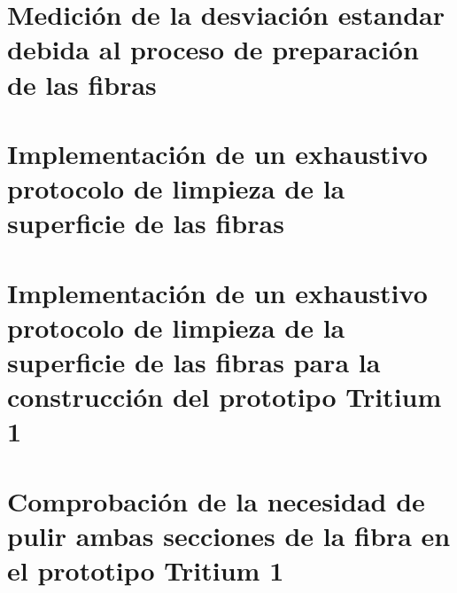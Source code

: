 \documentclass[11pt,a4paper]{article}
\begin{document}
\section{Medición de la desviación estandar debida al proceso de preparación de las fibras} \label{sec:sigmaint}


\section{Implementación de un exhaustivo protocolo de limpieza de la superficie de las fibras} \label{sec:liempieza}


\section{Implementación de un exhaustivo protocolo de limpieza de la superficie de las fibras para la construcción del prototipo Tritium 1} \label{sec:limpiezaICMOL}


\section{Comprobación de la necesidad de pulir ambas secciones de la fibra en el prototipo Tritium 1} \label{sec:ambascaras}

\end{document}

